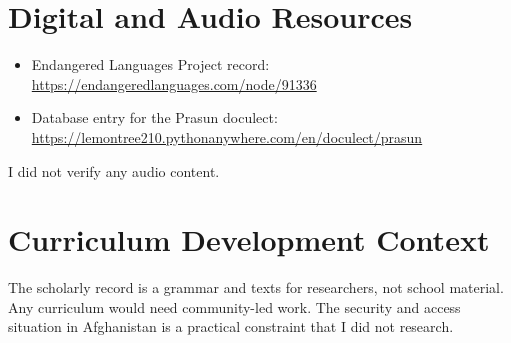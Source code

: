 \documentclass[12pt]{article}
\begin{document}
\section{Digital and Audio Resources}
\begin{itemize}
\item Endangered Languages Project record: \url{https://endangeredlanguages.com/node/91336}
\item Database entry for the Prasun doculect: \url{https://lemontree210.pythonanywhere.com/en/doculect/prasun}
\end{itemize}
I did not verify any audio content.

\section{Curriculum Development Context}
The scholarly record is a grammar and texts for researchers, not school material. Any curriculum would need community-led work. The security and access situation in Afghanistan is a practical constraint that I did not research.
\end{document}
